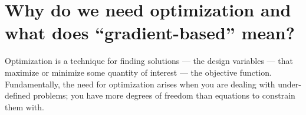 \documentclass[conf]{new-aiaa}
\begin{document}






    \section{Why do we need optimization and what does ``gradient-based'' mean?}
        
        Optimization is a technique for finding solutions --- the design variables --- that maximize or minimize some quantity of interest  --- the objective function. 
        Fundamentally, the need for optimization arises when you are dealing with under-defined problems; you have more degrees of freedom than equations to constrain them with. 
\end{document}
